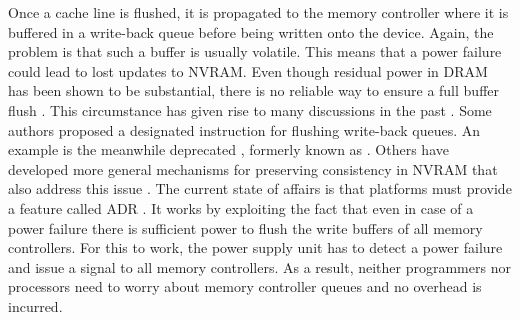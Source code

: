 Once a cache line is flushed, it is propagated to the memory controller where it
is buffered in a write-back queue before being written onto the device. Again,
the problem is that such a buffer is usually volatile. This means that a power
failure could lead to lost updates to NVRAM. Even though residual power in DRAM
has been shown to be substantial, there is no reliable way to ensure a full
buffer flush \cite{halderman2008lest}. This circumstance has given rise to many
discussions in the past \cite{condit2009better, dulloor2014system,
kolli2016high}. Some authors proposed a designated instruction for flushing
write-back queues. An example is the meanwhile deprecated ,
formerly known as  \cite{dulloor2014system, oukid2015instant,
schwalb2015nvm_malloc, volos2017whisper}. Others have developed more general
mechanisms for preserving consistency in NVRAM that also address this issue
\cite{condit2009better, pelley2014memory}. The current state of affairs is
that platforms must provide a feature called ADR \cite{volos2017whisper}. It
works by exploiting the fact that even in case of a power failure there is
sufficient power to flush the write buffers of all memory controllers. For this
to work, the power supply unit has to detect a power failure and issue a signal
to all memory controllers. As a result, neither programmers nor processors need to worry about memory controller queues and no overhead is incurred.
